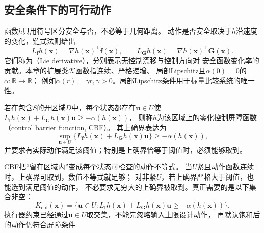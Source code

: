\subsection{安全条件下的可行动作}
函数$h$只用符号区分安全与否，不必等于几何距离。
动作是否安全取决于$h$沿速度的变化，链式法则给出
\[
  L_{\bm f}h(\bm x)=\nabla h(\bm x)^\top\bm f(\bm x),
  \qquad
  L_{\bm G}h(\bm x)=\nabla h(\bm x)^\top\bm G(\bm x).
\]
它们称为（Lie derivative），分别表示无控制漂移与控制方向对
安全函数变化率的贡献。本章的扩展类$\mathcal K$函数指连续、严格递增、
局部Lipschitz且$\alpha(0)=0$的$\alpha:\mathbb R\to\mathbb R$；
例如$\alpha(r)=\gamma r,\gamma>0$。局部Lipschitz条件用于标量比较系统的唯一性。

\begin{definition}[零化控制屏障函数]
\label{def:control-cbf}
若在包含$S$的开区域$D$中，每个状态都存在$\bm u\in U$使
$L_{\bm f}h(\bm x)+L_{\bm G}h(\bm x)\bm u\geq-\alpha(h(\bm x))$，
则称$h$为该区域上的零化控制屏障函数（control barrier function, CBF）。
其上确界表达为
\begin{equation}
  \sup_{\bm u\in U}
  \{L_{\bm f}h(\bm x)+L_{\bm G}h(\bm x)\bm u\}
  \geq-\alpha(h(\bm x)),
  \label{eq:control-cbf-existence}
\end{equation}
并要求有实际动作满足该阈值；特别是上确界恰等于阈值时，必须能够取到。
\end{definition}
CBF把“留在区域内”变成每个状态可检查的动作不等式。
当$U$紧且动作函数连续时，上确界可取到，数值不等式就足够；
对非紧$U$，若上确界严格大于阈值，也能选到满足阈值的动作，
不必要求无穷大的上确界被取到。真正需要的是以下集合非空：
\begin{equation}
  K_{\mathrm{cbf}}(\bm x)=
  \{\bm u\in U:L_{\bm f}h(\bm x)+L_{\bm G}h(\bm x)\bm u
                      \geq-\alpha(h(\bm x))\}.
  \label{eq:control-cbf-action-set}
\end{equation}
执行器约束已经通过$\bm u\in U$取交集，不能先忽略输入上限设计动作，
再默认饱和后的动作仍符合屏障条件

